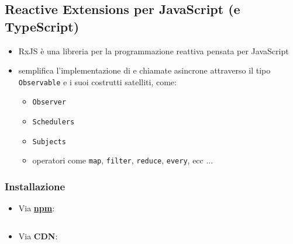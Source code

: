         \subsection{Reactive Extensions per JavaScript (e TypeScript)}\label{subsec:rxjs}

        \begin{frame}[fragile]{\insertsectionhead}
            \begin{block}{\insertsubsectionhead\footnotemark}
                \begin{itemize}
                    \item
                        RxJS è una libreria per la programmazione reattiva pensata per JavaScript
                    \item
                        semplifica l'implementazione di  e chiamate asincrone attraverso il tipo \texttt{Observable} e i suoi costrutti satelliti, come:
                        \begin{itemize}
                            \item \texttt{Observer}
                            \item \texttt{Schedulers}
                            \item \texttt{Subjects}
                            \item operatori come \texttt{map}, \texttt{filter}, \texttt{reduce}, \texttt{every}, ecc ...
                        \end{itemize}
                \end{itemize}
            \end{block}
        \end{frame}

        \begin{frame}[fragile]{\insertsectionhead}
        \subsubsection{Installazione}\label{subsec:install}
        \begin{block}{\insertsubsubsectionhead}
            \begin{itemize}
                \item
                    Via \textbf{\url{npm}}:
                    \inputminted[fontsize=\scriptsize]{text}{src/npm_install.sh}
                \item
                    Via \textbf{\footnotesize CDN}:
                    \inputminted[fontsize=\scriptsize]{text}{src/cdn_install.html}
            \end{itemize}
        \end{block}
        \end{frame}

